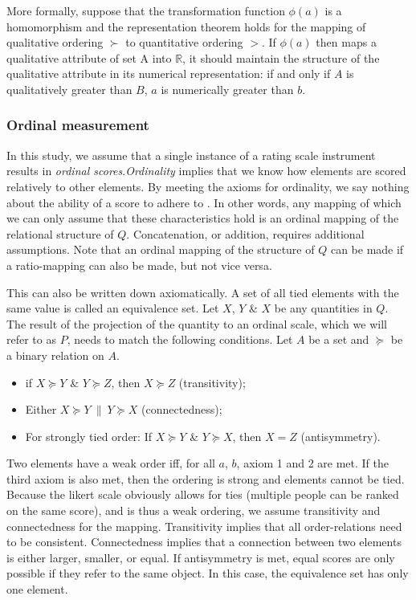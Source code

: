 \documentclass[utf8]{FrontiersinVancouver}
\begin{document}
More formally, suppose that the transformation function $\phi(a)$ is a homomorphism and the representation theorem holds for the mapping of qualitative ordering $\succ$ to quantitative ordering $>$. If $\phi(a)$ then maps a qualitative attribute of set A into $\mathbb{R}$, it should maintain the structure of the qualitative attribute in its numerical representation: if and only if $A$ is qualitatively greater than $B$, $a$ is numerically greater than $b$.

\subsubsection{Ordinal measurement}
In this study, we assume that a single instance of a rating scale instrument results in \textit{ordinal scores}.\textit{Ordinality} implies that we know how elements are scored relatively to other elements. By meeting the axioms for ordinality, we say nothing about the ability of a score to adhere to . In other words, any mapping of which we can only assume that these characteristics hold is an ordinal mapping of the relational structure of $Q$. Concatenation, or addition, requires additional assumptions. Note that an ordinal mapping of the structure of $Q$ can be made if a ratio-mapping can also be made, but not vice versa. 

This can also be written down axiomatically. A set of all tied elements with the same value is called an equivalence set. Let $X$, $Y$ \& $X$ be any quantities in $Q$. The result of the projection of the quantity to an ordinal scale, which we will refer to as $P$, needs to match the following conditions. Let $A$ be a set and $\succeq$ be a binary relation on $A$. 

\begin{itemize}
    \item if $X \succeq Y$ \& $Y \succeq Z$, then $X \succeq Z$ (transitivity);
    \item Either $X \succeq Y\ \|\ Y \succeq X$ (connectedness);
    \item For strongly tied order: If $X \succeq Y$ \& $Y \succeq X$, then $X = Z$ (antisymmetry).
\end{itemize}

Two elements have a weak order iff, for all $a$, $b$, axiom 1 and 2 are met.  If the third axiom is also met, then the ordering is strong and elements cannot be tied. Because the likert scale obviously allows for ties (multiple people can be ranked on the same score), and is thus a weak ordering, we assume transitivity and connectedness for the mapping. Transitivity implies that all order-relations need to be consistent. Connectedness implies that a connection between two elements is either larger, smaller, or equal. If antisymmetry is met, equal scores are only possible if they refer to the same object. In this case, the equivalence set has only one element.
\end{document}
